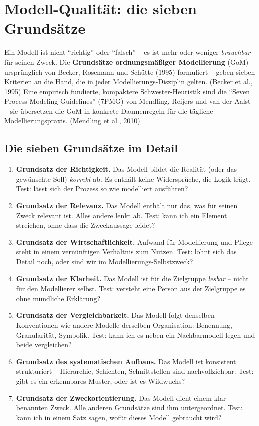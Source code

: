 \documentclass[11pt,a4paper,oneside]{article}
\newcommand{\fachbegriff}[1]{\textbf{#1}}
\newcommand{\quelle}[1]{{\footnotesize\color{lpGray}(#1)}}
\begin{document}
\section{Modell-Qualität: die sieben Grundsätze}

Ein Modell ist nicht ``richtig'' oder ``falsch'' -- es ist mehr oder weniger \emph{brauchbar} für seinen Zweck. Die \fachbegriff{Grundsätze ordnungsmäßiger Modellierung} (GoM) -- ursprünglich von Becker, Rosemann und Schütte (1995) formuliert -- geben sieben Kriterien an die Hand, die in jeder Modellierungs-Disziplin gelten. \quelle{Becker et al., 1995} Eine empirisch fundierte, kompaktere Schwester-Heuristik sind die ``Seven Process Modeling Guidelines'' (7PMG) von Mendling, Reijers und van der Aalst -- sie übersetzen die GoM in konkrete Daumenregeln für die tägliche Modellierungspraxis. \quelle{Mendling et al., 2010}

\subsection{Die sieben Grundsätze im Detail}

\begin{enumerate}
  \item \fachbegriff{Grundsatz der Richtigkeit.} Das Modell bildet die Realität (oder das gewünschte Soll) \emph{korrekt} ab. Es enthält keine Widersprüche, die Logik trägt. Test: lässt sich der Prozess so wie modelliert ausführen?
  \item \fachbegriff{Grundsatz der Relevanz.} Das Modell enthält nur das, was für seinen Zweck relevant ist. Alles andere lenkt ab. Test: kann ich ein Element streichen, ohne dass die Zweckaussage leidet?
  \item \fachbegriff{Grundsatz der Wirtschaftlichkeit.} Aufwand für Modellierung und Pflege steht in einem vernünftigen Verhältnis zum Nutzen. Test: lohnt sich das Detail noch, oder sind wir im Modellierungs-Selbstzweck?
  \item \fachbegriff{Grundsatz der Klarheit.} Das Modell ist für die Zielgruppe \emph{lesbar} -- nicht für den Modellierer selbst. Test: versteht eine Person aus der Zielgruppe es ohne mündliche Erklärung?
  \item \fachbegriff{Grundsatz der Vergleichbarkeit.} Das Modell folgt denselben Konventionen wie andere Modelle derselben Organisation: Benennung, Granularität, Symbolik. Test: kann ich es neben ein Nachbarmodell legen und beide vergleichen?
  \item \fachbegriff{Grundsatz des systematischen Aufbaus.} Das Modell ist konsistent strukturiert -- Hierarchie, Schichten, Schnittstellen sind nachvollziehbar. Test: gibt es ein erkennbares Muster, oder ist es Wildwuchs?
  \item \fachbegriff{Grundsatz der Zweckorientierung.} Das Modell dient einem klar benannten Zweck. Alle anderen Grundsätze sind ihm untergeordnet. Test: kann ich in einem Satz sagen, wofür dieses Modell gebraucht wird?
\end{enumerate}
\end{document}
